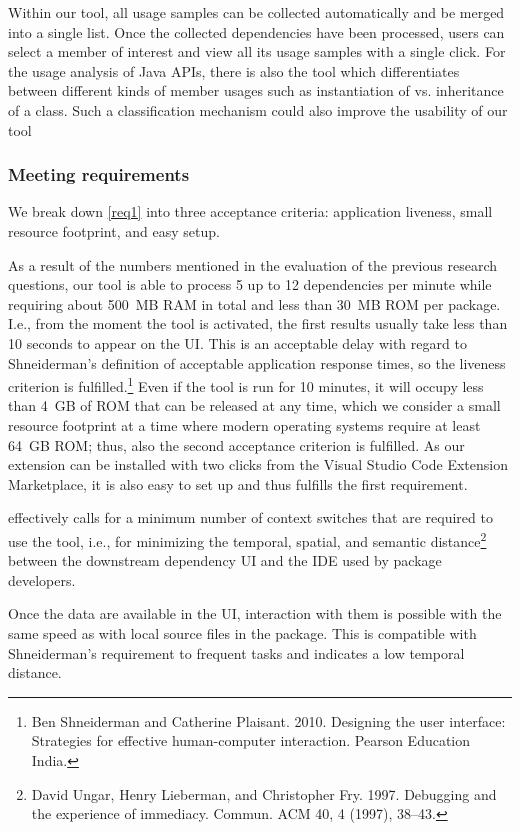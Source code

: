 Within our tool, all usage samples can be collected automatically and be merged into a single list.
Once the collected dependencies have been processed, users can select a member of interest and view all its usage samples with a single click.
For the usage analysis of Java APIs, there is also the tool \citep{de2013multi} which differentiates between different kinds of member usages such as instantiation of vs. inheritance of a class.
Such a classification mechanism could also improve the usability of our tool

\subsubsection{Meeting requirements}

We break down \cref{req1} into three acceptance criteria: application liveness, small resource footprint, and easy setup.

As a result of the numbers mentioned in the evaluation of the previous research questions, our tool is able to process 5 up to 12 dependencies per minute while requiring about \SI{500}{MB} RAM in total and less than \SI{30}{MB} ROM per package.
I.e., from the moment the tool is activated, the first results usually take less than 10 seconds to appear on the UI.
This is an acceptable delay with regard to Shneiderman's definition of acceptable application response times, so the liveness criterion is fulfilled.\footnote{Ben Shneiderman and Catherine Plaisant. 2010. Designing the user interface: Strategies for effective human-computer interaction. Pearson Education India.}
Even if the tool is run for 10 minutes, it will occupy less than \SI{4}{GB} of ROM that can be released at any time, which we consider a small resource footprint at a time where modern operating systems require at least \SI{64}{GB} ROM; thus, also the second acceptance criterion is fulfilled.
As our extension can be installed with two clicks from the Visual Studio Code Extension Marketplace, it is also easy to set up and thus fulfills the first requirement.

 effectively calls for a minimum number of context switches that are required to use the tool, i.e., for minimizing the temporal, spatial, and semantic distance\footnote{David Ungar, Henry Lieberman, and Christopher Fry. 1997. Debugging and the experience of immediacy. Commun. ACM 40, 4 (1997), 38–43.} between the downstream dependency UI and the IDE used by package developers.

Once the data are available in the UI, interaction with them is possible with the same speed as with local source files in the package.
This is compatible with Shneiderman's requirement to frequent tasks and indicates a low temporal distance.

